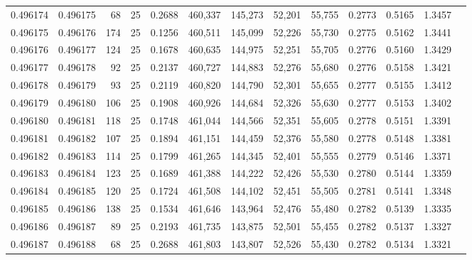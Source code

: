 \begin{tabular}{rrrrrrrrrrrrr}
0.496174 & 0.496175 &    68 &  25 &                                     0.2688 & 460,337 & 145,273 &  52,201 &  55,755 & 0.2773 & 0.5165 & 1.3457 \\
0.496175 & 0.496176 &   174 &  25 &                                     0.1256 & 460,511 & 145,099 &  52,226 &  55,730 & 0.2775 & 0.5162 & 1.3441 \\
0.496176 & 0.496177 &   124 &  25 &                                     0.1678 & 460,635 & 144,975 &  52,251 &  55,705 & 0.2776 & 0.5160 & 1.3429 \\
0.496177 & 0.496178 &    92 &  25 &                                     0.2137 & 460,727 & 144,883 &  52,276 &  55,680 & 0.2776 & 0.5158 & 1.3421 \\
0.496178 & 0.496179 &    93 &  25 &                                     0.2119 & 460,820 & 144,790 &  52,301 &  55,655 & 0.2777 & 0.5155 & 1.3412 \\
0.496179 & 0.496180 &   106 &  25 &                                     0.1908 & 460,926 & 144,684 &  52,326 &  55,630 & 0.2777 & 0.5153 & 1.3402 \\
0.496180 & 0.496181 &   118 &  25 &                                     0.1748 & 461,044 & 144,566 &  52,351 &  55,605 & 0.2778 & 0.5151 & 1.3391 \\
0.496181 & 0.496182 &   107 &  25 &                                     0.1894 & 461,151 & 144,459 &  52,376 &  55,580 & 0.2778 & 0.5148 & 1.3381 \\
0.496182 & 0.496183 &   114 &  25 &                                     0.1799 & 461,265 & 144,345 &  52,401 &  55,555 & 0.2779 & 0.5146 & 1.3371 \\
0.496183 & 0.496184 &   123 &  25 &                                     0.1689 & 461,388 & 144,222 &  52,426 &  55,530 & 0.2780 & 0.5144 & 1.3359 \\
0.496184 & 0.496185 &   120 &  25 &                                     0.1724 & 461,508 & 144,102 &  52,451 &  55,505 & 0.2781 & 0.5141 & 1.3348 \\
0.496185 & 0.496186 &   138 &  25 &                                     0.1534 & 461,646 & 143,964 &  52,476 &  55,480 & 0.2782 & 0.5139 & 1.3335 \\
0.496186 & 0.496187 &    89 &  25 &                                     0.2193 & 461,735 & 143,875 &  52,501 &  55,455 & 0.2782 & 0.5137 & 1.3327 \\
0.496187 & 0.496188 &    68 &  25 &                                     0.2688 & 461,803 & 143,807 &  52,526 &  55,430 & 0.2782 & 0.5134 & 1.3321 \\

\end{tabular}
